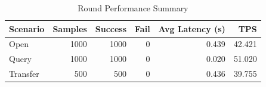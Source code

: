 \begin{table}
\caption{Round Performance Summary}
\label{tab:round_perf}
\begin{tabular}{lrrrrr}
\toprule
Scenario & Samples & Success & Fail & Avg Latency (s) & TPS \\
\midrule
Open & 1000 & 1000 & 0 & 0.439 & 42.421 \\
Query & 1000 & 1000 & 0 & 0.020 & 51.020 \\
Transfer & 500 & 500 & 0 & 0.436 & 39.755 \\
\bottomrule
\end{tabular}
\end{table}
